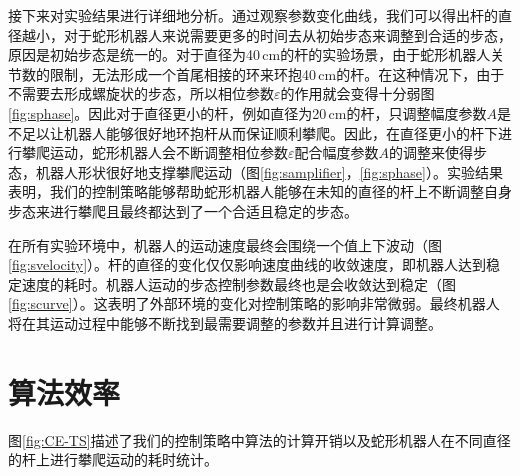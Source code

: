 接下来对实验结果进行详细地分析。通过观察参数变化曲线，我们可以得出杆的直径越小，对于蛇形机器人来说需要更多的时间去从初始步态来调整到合适的步态，原因是初始步态是统一的。对于直径为40\,cm的杆的实验场景，由于蛇形机器人关节数的限制，无法形成一个首尾相接的环来环抱40\,cm的杆。在这种情况下，由于不需要去形成螺旋状的步态，所以相位参数$\varepsilon$的作用就会变得十分弱图\ref{fig:sphase}。因此对于直径更小的杆，例如直径为20\,cm的杆，只调整幅度参数$A$是不足以让机器人能够很好地环抱杆从而保证顺利攀爬。因此，在直径更小的杆下进行攀爬运动，蛇形机器人会不断调整相位参数$\varepsilon$配合幅度参数$A$的调整来使得步态，机器人形状很好地支撑攀爬运动（图\ref{fig:samplifier}，\ref{fig:sphase}）。实验结果表明，我们的控制策略能够帮助蛇形机器人能够在未知的直径的杆上不断调整自身步态来进行攀爬且最终都达到了一个合适且稳定的步态。

在所有实验环境中，机器人的运动速度最终会围绕一个值上下波动（图\ref{fig:svelocity}）。杆的直径的变化仅仅影响速度曲线的收敛速度，即机器人达到稳定速度的耗时。机器人运动的步态控制参数最终也是会收敛达到稳定（图\ref{fig:scurve}）。这表明了外部环境的变化对控制策略的影响非常微弱。最终机器人将在其运动过程中能够不断找到最需要调整的参数并且进行计算调整。



\section{算法效率}
图\ref{fig:CE-TS}描述了我们的控制策略中算法的计算开销以及蛇形机器人在不同直径的杆上进行攀爬运动的耗时统计。

